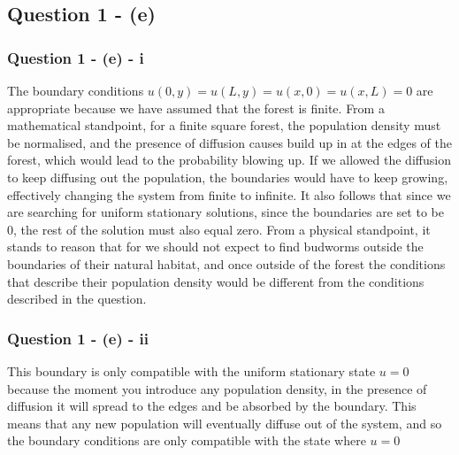 \documentclass[11pt,a4paper]{article}
\begin{document}
\subsection{Question 1 - (e)}
\label{sec:question1:subsec:parte}

\subsubsection{Question 1 - (e) - i}
\label{sec:question1:subsec:parte:subsub:i}
The boundary conditions $u(0,y) = u(L,y) = u(x,0) = u(x,L) = 0$ are appropriate because we have assumed that the forest is finite. From a mathematical standpoint, for a finite square forest, the population density must be normalised, and the presence of diffusion causes build up in at the edges of the forest, which would lead to the probability blowing up. If we allowed the diffusion to keep diffusing out the population, the boundaries would have to keep growing, effectively changing the system from finite to infinite. It also follows that since we are searching for uniform stationary solutions, since the boundaries are set to be 0, the rest of the solution must also equal zero. From a physical standpoint, it stands to reason that for we should not expect to find budworms outside the boundaries of their natural habitat, and once outside of the forest the conditions that describe their population density would be different from the conditions described in the question.

\subsubsection{Question 1 - (e) - ii}
\label{sec:question1:subsec:parte:subsub:ii}
This boundary is only compatible with the uniform stationary state $u=0$ because the moment you introduce any population density, in the presence of diffusion it will spread to the edges and be absorbed by the boundary. This means that any new population will eventually diffuse out of the system, and so the boundary conditions are only compatible with the state where $u=0$

\end{document}
